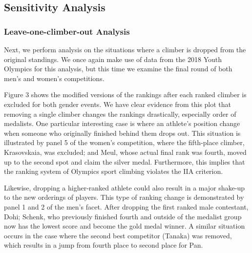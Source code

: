 \documentclass[12pt]{article}
\begin{document}
\hypertarget{sensitivity-analysis}{%
\subsection{Sensitivity Analysis}\label{sensitivity-analysis}}

\hypertarget{leave-one-climber-out-analysis}{%
\subsubsection{Leave-one-climber-out
Analysis}\label{leave-one-climber-out-analysis}}

Next, we perform analysis on the situations where a climber is dropped
from the original standings. We once again make use of data from the
2018 Youth Olympics for this analysis, but this time we examine the
final round of both men's and women's competitions.

Figure 3 shows the modified versions of the rankings after each ranked
climber is excluded for both gender events. We have clear evidence from
this plot that removing a single climber changes the rankings
drastically, especially order of medalists. One particular interesting
case is where an athlete's position change when someone who originally
finished behind them drops out. This situation is illustrated by panel 5
of the women's competition, where the fifth-place climber, Krasovskaia,
was excluded; and Meul, whose actual final rank was fourth, moved up to
the second spot and claim the silver medal. Furthermore, this implies
that the ranking system of Olympics sport climbing violates the IIA
criterion.

Likewise, dropping a higher-ranked athlete could also result in a major
shake-up to the new orderings of players. This type of ranking change is
demonstrated by panel 1 and 2 of the men's facet. After dropping the
first ranked male contestant, Dohi; Schenk, who previously finished
fourth and outside of the medalist group now has the lowest score and
become the gold medal winner. A similar situation occurs in the case
where the second best competitor (Tanaka) was removed, which results in
a jump from fourth place to second place for Pan.
\end{document}
